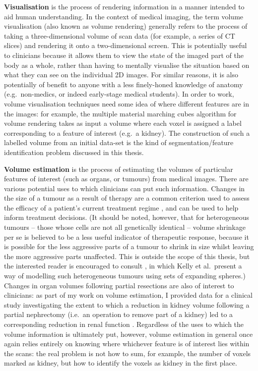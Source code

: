 \textbf{Visualisation} is the process of rendering information in a manner intended to aid human understanding. In the context of medical imaging, the term volume visualisation (also known as volume rendering) generally refers to the process of taking a three-dimensional volume of scan data (for example, a series of CT slices) and rendering it onto a two-dimensional screen. This is potentially useful to clinicians because it allows them to view the state of the imaged part of the body as a whole, rather than having to mentally visualise the situation based on what they can see on the individual 2D images. For similar reasons, it is also potentially of benefit to anyone with a less finely-honed knowledge of anatomy (e.g.~non-medics, or indeed early-stage medical students). In order to work, volume visualisation techniques need some idea of where different features are in the images: for example, the multiple material marching cubes algorithm \cite{wu03} for volume rendering takes as input a volume where each voxel is assigned a label corresponding to a feature of interest (e.g.~a kidney). The construction of such a labelled volume from an initial data-set is the kind of segmentation/feature identification problem discussed in this thesis.

\textbf{Volume estimation} is the process of estimating the volumes of particular features of interest (such as organs, or tumours) from medical images. There are various potential uses to which clinicians can put such information. Changes in the size of a tumour as a result of therapy are a common criterion used to assess the efficacy of a patient's current treatment regime \cite{recist09}, and can be used to help inform treatment decisions. (It should be noted, however, that for heterogeneous tumours -- those whose cells are not all genetically identical -- volume shrinkage per se is believed to be a less useful indicator of therapeutic response, because it is possible for the less aggressive parts of a tumour to shrink in size whilst leaving the more aggressive parts unaffected. This is outside the scope of this thesis, but the interested reader is encouraged to consult \cite{kelly07}, in which Kelly et al.\ present a way of modelling such heterogeneous tumours using sets of expanding spheres.) Changes in organ volumes following partial resections are also of interest to clinicians: as part of my work on volume estimation, I provided data for a clinical study investigating the extent to which a reduction in kidney volume following a partial nephrectomy (i.e.~an operation to remove part of a kidney) led to a corresponding reduction in renal function \cite{pbgmvc09}. Regardless of the uses to which the volume information is ultimately put, however, volume estimation in general once again relies entirely on knowing where whichever feature is of interest lies within the scans: the real problem is not how to sum, for example, the number of voxels marked as kidney, but how to identify the voxels as kidney in the first place.

